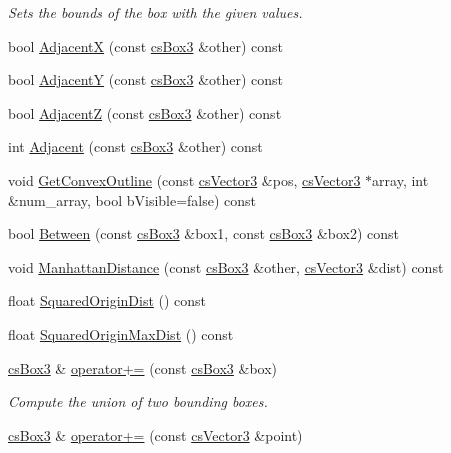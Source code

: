 \begin{DoxyCompactItemize}
\begin{DoxyCompactList}\small\item\em Sets the bounds of the box with the given values. \end{DoxyCompactList}\item 
bool \hyperlink{classcsBox3_a68d9c65cbf3a97bdc1fc61913aa009b5}{AdjacentX} (const \hyperlink{classcsBox3}{cs\+Box3} \&other) const 
\item 
bool \hyperlink{classcsBox3_a34ead7c3742758e1d7afd3b8da9fa089}{AdjacentY} (const \hyperlink{classcsBox3}{cs\+Box3} \&other) const 
\item 
bool \hyperlink{classcsBox3_ad1a515d501609c5a877c12e6516861b1}{AdjacentZ} (const \hyperlink{classcsBox3}{cs\+Box3} \&other) const 
\item 
int \hyperlink{classcsBox3_a3ff96830825b85f7cd517c16ae3c9746}{Adjacent} (const \hyperlink{classcsBox3}{cs\+Box3} \&other) const 
\item 
void \hyperlink{classcsBox3_a480419ab9fd05251a381323a664097ea}{Get\+Convex\+Outline} (const \hyperlink{classcsVector3}{cs\+Vector3} \&pos, \hyperlink{classcsVector3}{cs\+Vector3} $\ast$array, int \&num\+\_\+array, bool b\+Visible=false) const 
\item 
bool \hyperlink{classcsBox3_aa5f168cfb01d4b76875c022529f23059}{Between} (const \hyperlink{classcsBox3}{cs\+Box3} \&box1, const \hyperlink{classcsBox3}{cs\+Box3} \&box2) const 
\item 
void \hyperlink{classcsBox3_a067ec5b8e9f6c16ba14ae2ab113972cd}{Manhattan\+Distance} (const \hyperlink{classcsBox3}{cs\+Box3} \&other, \hyperlink{classcsVector3}{cs\+Vector3} \&dist) const 
\item 
float \hyperlink{classcsBox3_ac42856d771e6be888c110cc644cd9f15}{Squared\+Origin\+Dist} () const 
\item 
float \hyperlink{classcsBox3_ab797ab62f59fc71e913168dd29b36799}{Squared\+Origin\+Max\+Dist} () const 
\item 
\hyperlink{classcsBox3}{cs\+Box3} \& \hyperlink{classcsBox3_ae8bc7303e469c5ba05d717e279b3501d}{operator+=} (const \hyperlink{classcsBox3}{cs\+Box3} \&box)\hypertarget{classcsBox3_ae8bc7303e469c5ba05d717e279b3501d}{}\label{classcsBox3_ae8bc7303e469c5ba05d717e279b3501d}

\begin{DoxyCompactList}\small\item\em Compute the union of two bounding boxes. \end{DoxyCompactList}\item 
\hyperlink{classcsBox3}{cs\+Box3} \& \hyperlink{classcsBox3_a8563bc98cd089efd92f72505e239b07a}{operator+=} (const \hyperlink{classcsVector3}{cs\+Vector3} \&point)\hypertarget{classcsBox3_a8563bc98cd089efd92f72505e239b07a}{}\label{classcsBox3_a8563bc98cd089efd92f72505e239b07a}


\end{DoxyCompactItemize}
